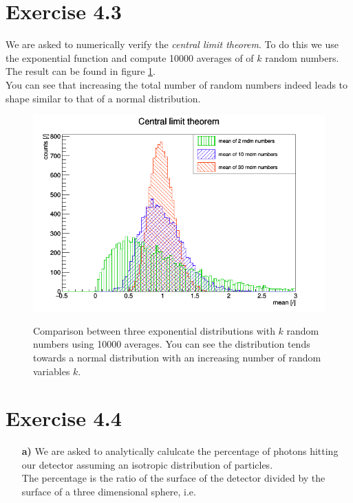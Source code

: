 \documentclass[10pt]{article}
\newenvironment{myfont}{\fontfamily{put}\selectfont}{\par}
\begin{document}
\begin{myfont}
\section*{Exercise 4.3}

We are asked to numerically verify the \textit{central limit theorem}. 
To do this we use the exponential function and compute \num{10000} averages of of $k$ random numbers.
The result can be found in figure \ref{fig:clt}. \\
You can see that increasing the total number of random numbers indeed leads to shape similar to that of a normal distribution.

\begin{figure}[H]
  \centering
  \caption{Comparison between three exponential distributions with $k$ random numbers using \num{10000} averages.
  You can see the distribution tends towards a normal distribution with an increasing number of random variables $k$.}
  \includegraphics[width = \textwidth]{./exercise4_3.png}
  \label{fig:clt}
\end{figure}



\section*{Exercise 4.4}

\begin{itemize}
  \item[\textbf{a)}] We are asked to analytically calulcate the percentage of photons hitting our detector assuming an isotropic distribution of particles. \\
  The percentage is the ratio of the surface of the detector divided by the surface of a three dimensional sphere, i.e.


\end{itemize}
\end{myfont}
\end{document}
